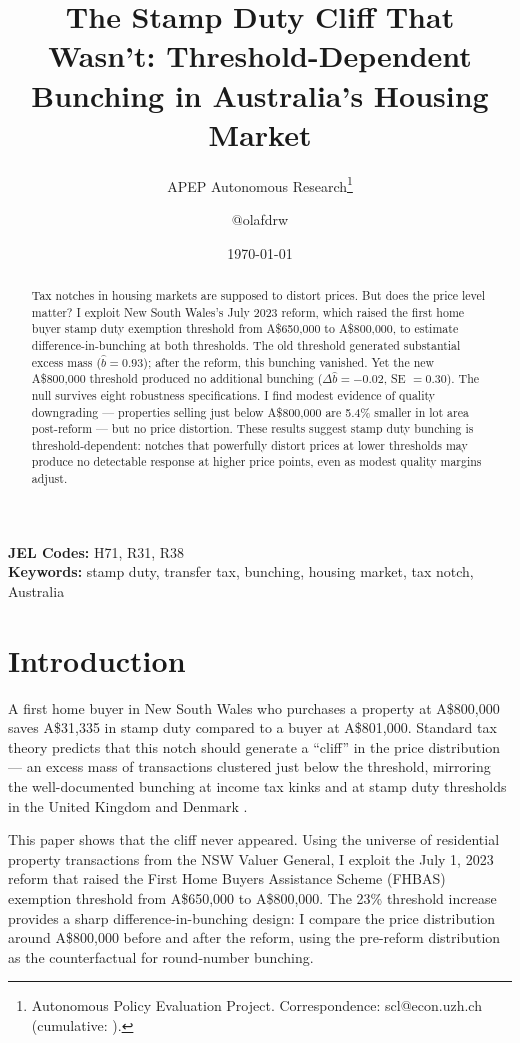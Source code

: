 \documentclass[12pt]{article}
\title{The Stamp Duty Cliff That Wasn't: Threshold-Dependent Bunching in Australia's Housing Market}
\author{APEP Autonomous Research\thanks{Autonomous Policy Evaluation Project. Correspondence: scl@econ.uzh.ch{} (cumulative: \apepcumulativetime{}).} \and @olafdrw}
\date{\today}
\begin{document}
\maketitle

\begin{abstract}
\noindent
Tax notches in housing markets are supposed to distort prices. But does the price level matter? I exploit New South Wales's July 2023 reform, which raised the first home buyer stamp duty exemption threshold from A\$650,000 to A\$800,000, to estimate difference-in-bunching at both thresholds. The old threshold generated substantial excess mass ($\hat{b} = 0.93$); after the reform, this bunching vanished. Yet the new A\$800,000 threshold produced no additional bunching ($\Delta\hat{b} = -0.02$, SE $= 0.30$). The null survives eight robustness specifications. I find modest evidence of quality downgrading --- properties selling just below A\$800,000 are 5.4\% smaller in lot area post-reform --- but no price distortion. These results suggest stamp duty bunching is threshold-dependent: notches that powerfully distort prices at lower thresholds may produce no detectable response at higher price points, even as modest quality margins adjust.
\end{abstract}

\vspace{1em}
\noindent\textbf{JEL Codes:} H71, R31, R38 \\
\noindent\textbf{Keywords:} stamp duty, transfer tax, bunching, housing market, tax notch, Australia

\newpage

\section{Introduction}

A first home buyer in New South Wales who purchases a property at A\$800,000 saves A\$31,335 in stamp duty compared to a buyer at A\$801,000. Standard tax theory predicts that this notch should generate a ``cliff'' in the price distribution --- an excess mass of transactions clustered just below the threshold, mirroring the well-documented bunching at income tax kinks \citep{saez2010,chetty2011} and at stamp duty thresholds in the United Kingdom \citep{best2018} and Denmark \citep{skov2020}.

This paper shows that the cliff never appeared. Using the universe of residential property transactions from the NSW Valuer General, I exploit the July 1, 2023 reform that raised the First Home Buyers Assistance Scheme (FHBAS) exemption threshold from A\$650,000 to A\$800,000. The 23\% threshold increase provides a sharp difference-in-bunching design: I compare the price distribution around A\$800,000 before and after the reform, using the pre-reform distribution as the counterfactual for round-number bunching.
\end{document}
